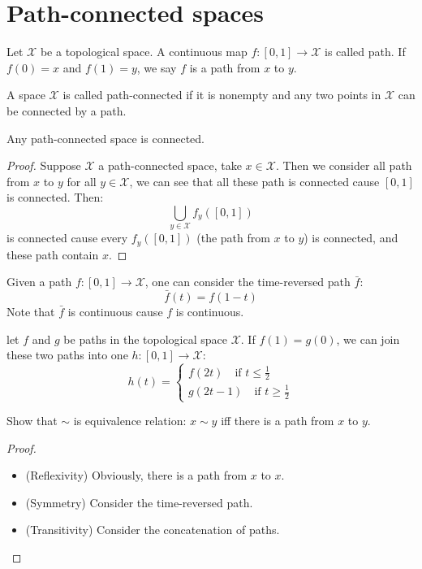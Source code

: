 \documentclass[./main.tex]{subfiles}
\begin{document}
\section{Path-connected spaces}

\begin{definition}
  Let $\mathcal{X}$ be a topological space.
  A continuous map $f : [0, 1] \rightarrow \mathcal{X}$
  is called path. If $f(0) = x$ and $f(1) = y$, we say
  $f$ is a path from $x$ to $y$.
\end{definition}

\begin{definition}
  A space $\mathcal{X}$ is called path-connected if it is nonempty
  and any two points in $\mathcal{X}$ can be connected by a path.
\end{definition}

\begin{theorem}
  Any path-connected space is connected.
\end{theorem}
\begin{proof}
  Suppose $\mathcal{X}$ a path-connected space, take $x \in \mathcal{X}$.
  Then we consider all path from $x$ to $y$ for all $y \in \mathcal{X}$,
  we can see that all these path is connected cause $[0, 1]$ is connected.
  Then:
  \[
  \bigcup_{y \in \mathcal{X}} f_y([0, 1])
  \]
  is connected cause every $f_y([0, 1])$ (the path from $x$ to $y$) is connected,
  and these path contain $x$.
\end{proof}

\begin{definition}
  Given a path $f : [0, 1] \rightarrow \mathcal{X}$, one can consider
  the time-reversed path $\bar{f}$:
  \[
  \bar{f}(t) = f(1 - t)
  \]
  Note that $\bar{f}$ is continuous cause $f$ is continuous.
\end{definition}

\begin{definition}
  let $f$ and $g$ be paths in the topological space $\mathcal{X}$.
  If $f(1) = g(0)$, we can join these two paths into one $h : [0, 1] \rightarrow \mathcal{X}$:
  \[
  h(t) = 
  \begin{cases}
  f(2t) \quad \text{if } t \leq \frac{1}{2} \\
  g(2t - 1) \quad \text{if } t \geq \frac{1}{2}
  \end{cases}
  \]
\end{definition}

\begin{theorem}
  Show that $\sim$ is equivalence relation: $x \sim y$ iff there is
  a path from $x$ to $y$.
\end{theorem}
\begin{proof}
  ~
  \begin{itemize}
    \item (Reflexivity) Obviously, there is a path from $x$ to $x$.
    \item (Symmetry) Consider the time-reversed path.
    \item (Transitivity) Consider the concatenation of paths.
  \end{itemize}
\end{proof}
\end{document}
